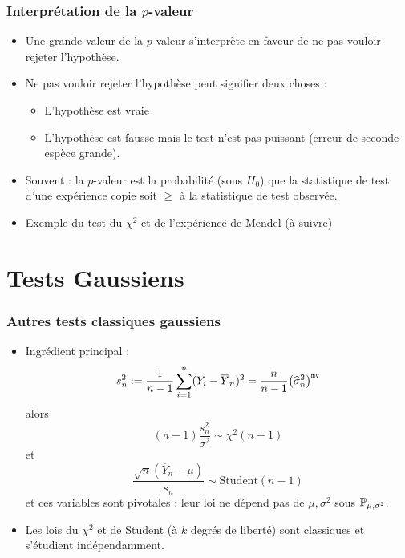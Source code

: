 \begin{frame}
\frametitle{Interprétation de la $p$-valeur}
\begin{itemize}
\item Une grande valeur de la $p$-valeur s'interprète en faveur de \alert{ne pas vouloir rejeter l'hypothèse}.
\item  Ne pas vouloir rejeter l'hypothèse  peut signifier deux choses :
\begin{itemize}
\item L'hypothèse est vraie
\item L'hypothèse est fausse \alert{ mais} le test n'est pas \alert{puissant} (erreur de seconde espèce \alert{grande}).
\end{itemize}
\item \alert{Souvent :} la $p$-valeur est la probabilité (sous $H_0$) que la statistique de test d'une expérience  copie  soit $\geq$ à la statistique de test observée.
\item \alert{Exemple du test du $\chi^2$ et de l'expérience de Mendel} (à suivre) %
\end{itemize}
\end{frame}


\section{Tests Gaussiens}

\begin{frame}
\frametitle{Autres tests classiques gaussiens}
\begin{itemize}
\item \alert{Ingrédient principal} :
$$s_n^2:=\frac{1}{n-1}\sum_{i = 1}^n (Y_i-\overline{Y}_n)^2 = \frac{n}{n-1}\big(\widehat \sigma^2_n\big)^{{\tt mv}}$$
alors
$$(n-1)\frac{s_n^2}{\sigma^2} \sim \chi^2(n-1)$$
et
$$\frac{\sqrt{n}(\overline{Y}_n-\mu)}{s_n} \sim \text{Student}(n-1)$$
et ces variables sont \alert{pivotales} : leur loi ne dépend pas de $\mu,\sigma^2$ sous $\operatorname{{\mathbb P}}_{\mu,\sigma^2}$.
\item Les lois du \alert{$\chi^2$} et de \alert{Student} (à $k$ degrés de liberté) sont classiques et s'étudient indépendamment.
\end{itemize}
\end{frame}

